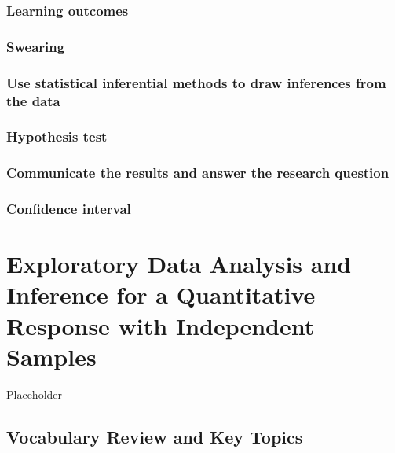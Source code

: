 \documentclass[
]{report}
\begin{document}
\subsection{Learning outcomes}\label{learning-outcomes-26}

\subsection{Swearing}\label{swearing}

\subsection*{Use statistical inferential methods to draw inferences from the data}\label{use-statistical-inferential-methods-to-draw-inferences-from-the-data-4}

\subsection*{Hypothesis test}\label{hypothesis-test-4}

\subsection*{Communicate the results and answer the research question}\label{communicate-the-results-and-answer-the-research-question-3}

\subsection*{Confidence interval}\label{confidence-interval-5}

\chapter{Exploratory Data Analysis and Inference for a Quantitative Response with Independent Samples}\label{exploratory-data-analysis-and-inference-for-a-quantitative-response-with-independent-samples}

Placeholder

\section{Vocabulary Review and Key Topics}\label{vocabulary-review-and-key-topics-9}
\end{document}
